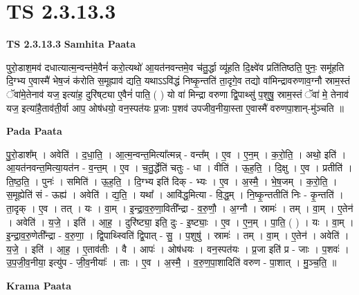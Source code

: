 \documentclass[17pt]{extarticle}
\begin{document}
\section{ TS 2.3.13.3 }

\textbf{TS 2.3.13.3 } \newline
\textbf{Samhita Paata} \newline

पुरो॒डाश॒मव॑ दधात्यात्म॒न्वन्त॑मे॒वैनं॑ करो॒त्यथो॑ आ॒यत॑नवन्तमे॒व च॑तु॒र्द्धा व्यू॑हति दि॒क्ष्वे॑व प्रति॑तिष्ठति॒ पुनः॒ समू॑हति दि॒ग्भ्य ए॒वास्मै॑ भेष॒जं क॑रोति स॒मूह्याव॑ द्यति॒ यथाऽऽवि॑द्धं निष्कृ॒न्तति॑ ता॒दृगे॒व तद्यो वा॑मिन्द्रावरुणाव॒ग्नौ स्राम॒स्तं ॅवा॑मे॒तेनाव॑ यज॒ इत्या॑ह॒ दुरि॑ष्‌ट्या ए॒वैनं॑ पाति॒ ( ) यो वा॑ मिन्द्रा वरुणा द्वि॒पाथ्सु॑ प॒शुषु॒ स्राम॒स्तं ॅवा॑ मे॒ तेनाव॑ यज॒ इत्या॑है॒ताव॑ती॒र्वा आप॒ ओष॑धयो॒ वन॒स्पत॑यः प्र॒जाः प॒शव॑ उपजीव॒नीया॒स्ता ए॒वास्मै॑ वरुणपा॒शान्-मु॑ञ्चति ॥ \newline

\textbf{Pada Paata} \newline

पु॒रो॒डाश᳚म् । अवेति॑ । द॒धा॒ति॒ । आ॒त्म॒न्वन्त॒मित्या᳚त्मन्न् - वन्त᳚म् । ए॒व । ए॒न॒म् । क॒रो॒ति॒ । अथो॒ इति॑ । आ॒यत॑नवन्त॒मित्या॒यत॑न - व॒न्त॒म् । ए॒व । च॒तु॒र्द्धेति॑ चतुः - धा । वीति॑ । ऊ॒ह॒ति॒ । दि॒क्षु । ए॒व । प्रतीति॑ । ति॒ष्ठ॒ति॒ । पुनः॑ । समिति॑ । ऊ॒ह॒ति॒ । दि॒ग्भ्य इति॑ दिक् - भ्यः । ए॒व ।   अ॒स्मै॒ । भे॒ष॒जम् । क॒रो॒ति॒ । स॒मूह्येति॑ सं - ऊह्य॑ । अवेति॑ । द्य॒ति॒ । यथा᳚ । आवि॑द्ध॒मित्या - वि॒द्ध॒म् । नि॒ष्कृ॒न्ततीति॑ निः - कृ॒न्तति॑ । ता॒दृक् । ए॒व । तत् । यः । वा॒म् । इ॒न्द्रा॒व॒रु॒णा॒विती᳚न्द्रा - व॒रु॒णौ॒ । अ॒ग्नौ । स्रामः॑ । तम् । वा॒म् । ए॒तेन॑ । अवेति॑ । य॒जे॒ । इति॑ । आ॒ह॒ । दुरि॑ष्ट्या॒ इति॒ दुः - इ॒ष्ट्याः॒ । ए॒व । ए॒न॒म् । पा॒ति॒ ( ) । यः । वा॒म् । इ॒न्द्रा॒व॒रु॒णेती᳚न्द्रा - व॒रु॒णा॒ । द्वि॒पाथ्स्विति॑ द्वि॒पात् - सु॒ । प॒शुषु॑ । स्रामः॑ । तम् । वा॒म् ।  ए॒तेन॑ । अवेति॑ । य॒जे॒ । इति॑ । आ॒ह॒ । ए॒ताव॑तीः । वै । आपः॑ । ओष॑धयः । वन॒स्पत॑यः । प्र॒जा इति॑ प्र - जाः । प॒शवः॑ । उ॒प॒जी॒व॒नीया॒ इत्यु॑प - जी॒व॒नीयाः᳚ । ताः । ए॒व । अ॒स्मै॒ । व॒रु॒ण॒पा॒शादिति॑ वरुण - पा॒शात् । मु॒ञ्च॒ति॒ ॥  \newline


\textbf{Krama Paata} \newline
\end{document}
